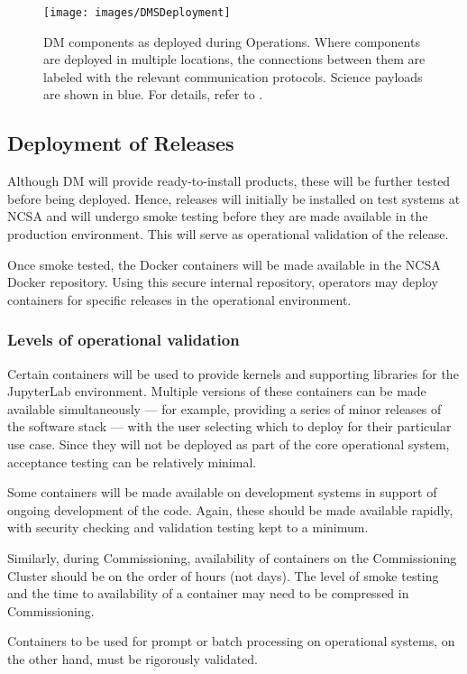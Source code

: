 \begin{figure}[htbp]
        \begin{center}
                \texttt{[image: images/DMSDeployment]}
                \caption{DM components as deployed during Operations.
                         Where components are deployed in multiple locations, the connections between them are labeled with the relevant communication protocols.
                         Science payloads are shown in blue.
                         For details, refer to .
                \label{fig:dmsdeploy}}
        \end{center}
\end{figure}

\subsection{Deployment of Releases}\label{sect:reldep}

Although DM will provide ready-to-install products, these will be further tested before being deployed.
Hence, releases will initially be installed on test systems at NCSA and will undergo smoke testing before they are made available in the production environment.
This will serve as operational validation of the release.

Once smoke tested, the Docker containers will be made available in the NCSA Docker repository.
Using this secure internal repository, operators may deploy containers for specific releases in the operational environment.

\subsubsection{Levels of operational validation}

Certain containers will be used to provide kernels and supporting libraries for the JupyterLab environment.
Multiple versions of these containers can be made available simultaneously --- for example, providing a series of minor releases of the software stack --- with the user selecting which to deploy for their particular use case.
Since they will not be deployed as part of the core operational system, acceptance testing can be relatively minimal.

Some containers will be made available on development systems in support of ongoing development of the code.
Again, these should be made available rapidly, with security checking and validation testing kept to a minimum.

Similarly, during Commissioning, availability of containers on the Commissioning Cluster should be on the order of hours (not days).
The level of smoke testing and the time to availability of a container may need to be compressed in Commissioning.

Containers to be used for prompt or batch processing on operational systems, on the other hand, must be rigorously validated.

